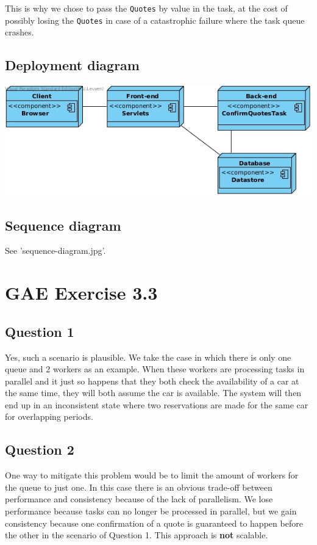 \documentclass[]{article}
\begin{document}
This is why we chose to pass the \texttt{Quotes} by value in the task, at the cost of possibly losing the \texttt{Quotes} in case of a catastrophic failure where the task queue crashes.

\subsection{Deployment diagram}
\includegraphics[width=\textwidth]{deployment-diagram.jpg}

\subsection{Sequence diagram}
See 'sequence-diagram.jpg'.

\section{GAE Exercise 3.3}
\subsection{Question 1}

Yes, such a scenario is plausible. We take the case in which there is only one queue and 2 workers as an example. When these workers are processing tasks in parallel and it just so happens that they both check the availability of a car at the same time, they will both assume the car is available. The system will then end up in an inconsistent state where two reservations are made for the same car for overlapping periods.

\subsection{Question 2}

One way to mitigate this problem would be to limit the amount of workers for the queue to just one. In this case there is an obvious trade-off between performance and consistency because of the lack of parallelism. We lose performance because tasks can no longer be processed in parallel, but we gain consistency because one confirmation of a quote is guaranteed to happen before the other in the scenario of Question 1. This approach is \textbf{not} scalable.
\end{document}
